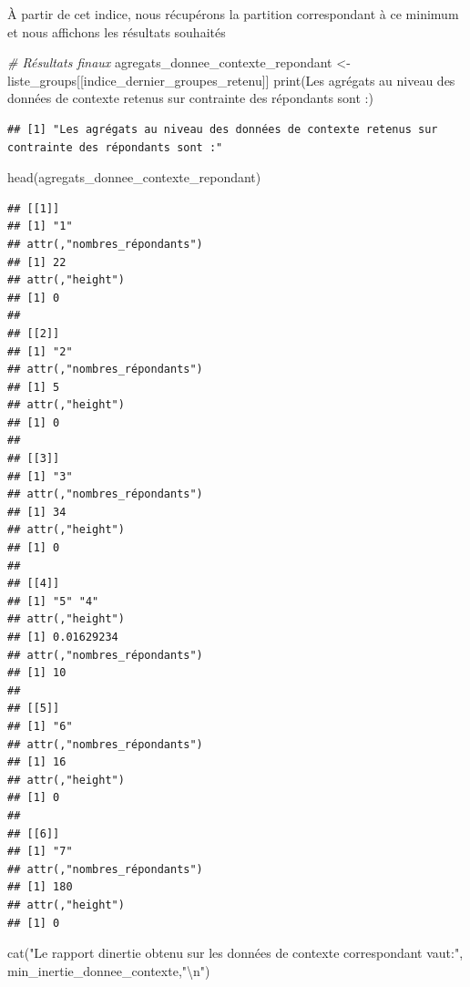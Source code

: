 \documentclass[
]{article}
\newenvironment{Shaded}{\begin{snugshade}}{\end{snugshade}}
\newcommand{\CommentTok}[1]{\textcolor[rgb]{0.56,0.35,0.01}{\textit{#1}}}
\newcommand{\FunctionTok}[1]{\textcolor[rgb]{0.00,0.00,0.00}{#1}}
\newcommand{\NormalTok}[1]{#1}
\newcommand{\OtherTok}[1]{\textcolor[rgb]{0.56,0.35,0.01}{#1}}
\newcommand{\SpecialCharTok}[1]{\textcolor[rgb]{0.00,0.00,0.00}{#1}}
\newcommand{\StringTok}[1]{\textcolor[rgb]{0.31,0.60,0.02}{#1}}
\begin{document}
À partir de cet indice, nous récupérons la partition correspondant à ce
minimum et nous affichons les résultats souhaités

\begin{Shaded}
\begin{Highlighting}[]
\CommentTok{\# Résultats finaux}
\NormalTok{agregats\_donnee\_contexte\_repondant }\OtherTok{\textless{}{-}}\NormalTok{ liste\_groups[[indice\_dernier\_groupes\_retenu]]}
\FunctionTok{print}\NormalTok{(}\StringTok{\textquotesingle{}Les agrégats au niveau des données de contexte retenus sur contrainte des répondants sont :\textquotesingle{}}\NormalTok{)}
\end{Highlighting}
\end{Shaded}

\begin{verbatim}
## [1] "Les agrégats au niveau des données de contexte retenus sur contrainte des répondants sont :"
\end{verbatim}

\begin{Shaded}
\begin{Highlighting}[]
\FunctionTok{head}\NormalTok{(agregats\_donnee\_contexte\_repondant)}
\end{Highlighting}
\end{Shaded}

\begin{verbatim}
## [[1]]
## [1] "1"
## attr(,"nombres_répondants")
## [1] 22
## attr(,"height")
## [1] 0
## 
## [[2]]
## [1] "2"
## attr(,"nombres_répondants")
## [1] 5
## attr(,"height")
## [1] 0
## 
## [[3]]
## [1] "3"
## attr(,"nombres_répondants")
## [1] 34
## attr(,"height")
## [1] 0
## 
## [[4]]
## [1] "5" "4"
## attr(,"height")
## [1] 0.01629234
## attr(,"nombres_répondants")
## [1] 10
## 
## [[5]]
## [1] "6"
## attr(,"nombres_répondants")
## [1] 16
## attr(,"height")
## [1] 0
## 
## [[6]]
## [1] "7"
## attr(,"nombres_répondants")
## [1] 180
## attr(,"height")
## [1] 0
\end{verbatim}

\begin{Shaded}
\begin{Highlighting}[]
\FunctionTok{cat}\NormalTok{(}\StringTok{"Le rapport d\textquotesingle{}inertie obtenu sur les données de contexte correspondant vaut:"}\NormalTok{, min\_inertie\_donnee\_contexte,}\StringTok{"}\SpecialCharTok{\textbackslash{}n}\StringTok{"}\NormalTok{)}
\end{Highlighting}
\end{Shaded}
\end{document}
